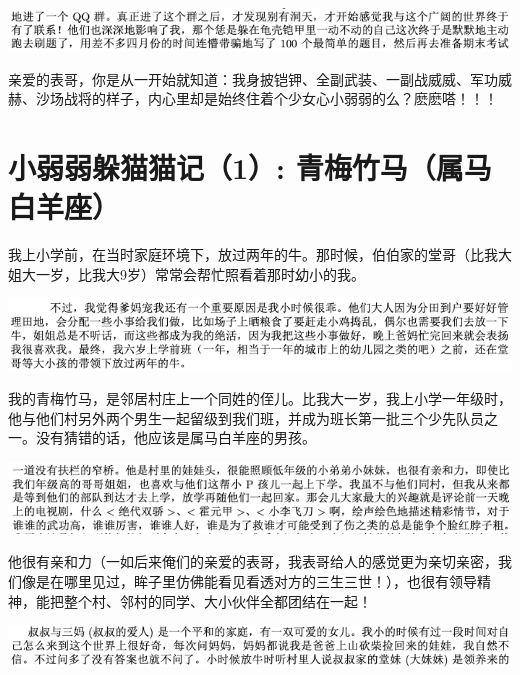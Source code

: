 \documentclass[9pt, b5paper]{article}
\begin{document}
\begin{center}
\includegraphics[width=.9\linewidth]{./pic/backups_plans_20210421_095520.png}
\end{center}

亲爱的表哥，你是从一开始就知道：我身披铠钾、全副武装、一副战威威、军功威赫、沙场战将的样子，内心里却是始终住着个少女心小弱弱的么？麽麽嗒！！！

\section{小弱弱躲猫猫记（1）: 青梅竹马（属马白羊座）}
\label{sec:orgd26122a}

我上小学前，在当时家庭环境下，放过两年的牛。那时候，伯伯家的堂哥（比我大姐大一岁，比我大9岁）常常会帮忙照看着那时幼小的我。

\begin{center}
\includegraphics[width=.9\linewidth]{./pic/backups_plans_20210422_095907.png}
\end{center}

我的青梅竹马，是邻居村庄上一个同姓的侄儿。比我大一岁，我上小学一年级时，他与他们村另外两个男生一起留级到我们班，并成为班长第一批三个少先队员之一。没有猜错的话，他应该是属马白羊座的男孩。

\begin{center}
\includegraphics[width=.9\linewidth]{./pic/backups_plans_20210422_074655.png}
\end{center}

他很有亲和力（一如后来俺们的亲爱的表哥，我表哥给人的感觉更为亲切亲密，我们像是在哪里见过，眸子里仿佛能看见看透对方的三生三世！），也很有领导精神，能把整个村、邻村的同学、大小伙伴全都团结在一起！

\begin{center}
\includegraphics[width=.9\linewidth]{./pic/backups_plans_20210422_094617.png}
\end{center}
\end{document}
